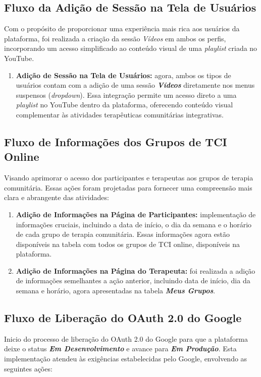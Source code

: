 \subsection{Fluxo da Adição de Sessão na Tela de Usuários}

    Com o propósito de proporcionar uma experiência mais rica aos usuários da plataforma, foi realizada a criação da sessão \textit{Vídeos} em ambos os perfis, incorporando um acesso simplificado ao conteúdo visual de uma \textit{playlist} criada no YouTube.

\begin{enumerate}
    \item\textbf{Adição de Sessão na Tela de Usuários:} agora, ambos os tipos de usuários contam com a adição de uma sessão \textit{\textbf{Vídeos}} diretamente nos menus suspensos (\textit{dropdown}). Essa integração permite um acesso direto a uma \textit{playlist} no YouTube dentro da plataforma, oferecendo conteúdo visual complementar às atividades terapêuticas comunitárias integrativas.
\end{enumerate}

\subsection{Fluxo de Informações dos Grupos de TCI Online}

    Visando aprimorar o acesso dos participantes e terapeutas aos grupos de terapia comunitária. Essas ações foram projetadas para fornecer uma compreensão mais clara e abrangente das atividades:

\begin{enumerate}
    \item\textbf{Adição de Informações na Página de Participantes:} implementação de informações cruciais, incluindo a data de início, o dia da semana e o horário de cada grupo de terapia comunitária. Essas informações agora estão disponíveis na tabela com todos os grupos de TCI online, disponíveis na plataforma.
    \item\textbf{Adição de Informações na Página do Terapeuta:} foi realizada a adição de informações semelhantes a ação anterior, incluindo data de início, dia da semana e horário, agora apresentadas na tabela \textit{\textbf{Meus Grupos}}.
\end{enumerate}

\subsection{Fluxo de Liberação do OAuth 2.0 do Google}
    Inicio do processo de liberação do OAuth 2.0 do Google para que a plataforma deixe o status \textbf{\textit{Em Desenvolvimento}} e avance para \textbf{\textit{Em Produção}}. Esta implementação atendeu às exigências estabelecidas pelo Google, envolvendo as seguintes ações:

